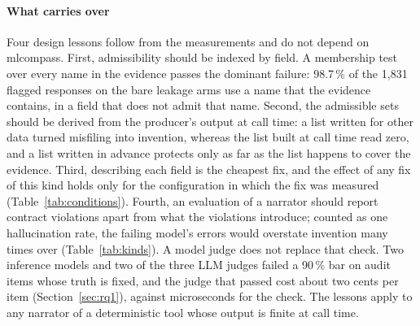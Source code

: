 \documentclass[smallextended,natbib]{svjour3}
\begin{document}
\paragraph{What carries over}
Four design lessons follow from the measurements and do not depend on
mlcompass. First, admissibility should be indexed by field. A membership test
over every name in the evidence passes the dominant failure: 98.7\,\% of the
1{,}831 flagged responses on the bare leakage arms use a name that the evidence
contains, in a field that does not admit that name. Second, the admissible
sets should be derived from the producer's output at call time: a list written
for other data turned misfiling into invention, whereas the list built at call
time read zero, and a list written in advance protects only as far as the list
happens to cover the evidence. Third, describing each field is the cheapest fix, and the
effect of any fix of this kind holds only for the configuration in which the fix was measured (Table~\ref{tab:conditions}). Fourth, an evaluation of a narrator
should report contract violations apart from what the violations introduce;
counted as one hallucination rate, the failing model's errors would overstate
invention many times over (Table~\ref{tab:kinds}). A model judge does not
replace that check. Two inference models and two of the three LLM judges failed
a 90\,\% bar on audit items whose truth is fixed, and the judge that passed
cost about two cents per item (Section~\ref{sec:rq1}), against microseconds for
the check. The
lessons apply to any narrator of a deterministic tool whose output is finite at
call time.
\end{document}
